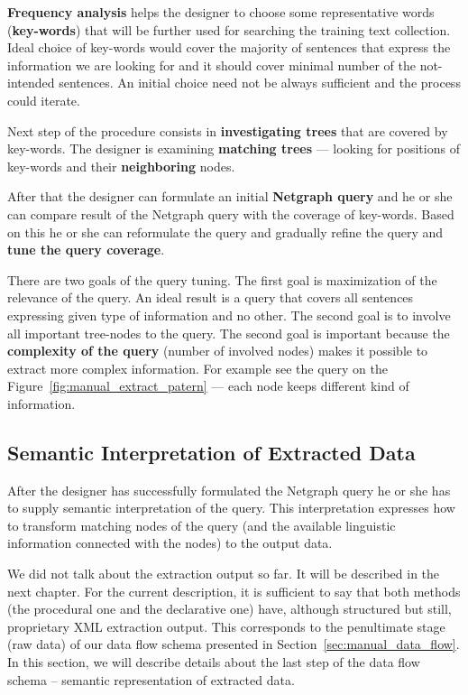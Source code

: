 \textbf{Frequency analysis} helps the designer to choose some representative words (\textbf{key-words}) that will be further used for searching the training text collection. Ideal choice of key-words would cover the majority of sentences that express the information we are looking for and it should cover minimal number of the not-intended sentences. An initial choice need not be always sufficient and the process could iterate.

Next step of the procedure consists in \textbf{investigating trees} that are covered by key-words. The designer is examining \textbf{matching trees} --- looking for positions of key-words and their \textbf{neighboring} nodes.

After that the designer can formulate an initial \textbf{Netgraph query} and he or she can compare result of the Netgraph query with the coverage of key-words. Based on this he or she can reformulate the query and gradually refine the query and \textbf{tune the query coverage}.

There are two goals of the query tuning. The first goal is maximization of the relevance of the query. An ideal result is a query that covers all sentences expressing given type of information and no other. The second goal is to involve all important tree-nodes to the query. The second goal is important because the \textbf{complexity of the query} (number of involved nodes) makes it possible to extract more complex information. For example see the query on the Figure~\ref{fig:manual_extract_patern} --- each node keeps different kind of information.


\subsection{Semantic Interpretation of Extracted Data} \label{sec:manual_sem_interpret}

After the designer has successfully formulated the Netgraph query he or she has to supply semantic interpretation of the query. This interpretation expresses how to transform matching nodes of the query (and the available linguistic information connected with the nodes) to the output data.

We did not talk about the extraction output so far. It will be described in the next chapter. For the current description, it is sufficient to say that both methods (the procedural one and the declarative one) have, although structured but still, proprietary XML extraction output. This corresponds to the penultimate stage (raw data) of our data flow schema presented in Section~\ref{sec:manual_data_flow}. In this section, we will describe details about the last step of the data flow schema -- semantic representation of extracted data.


